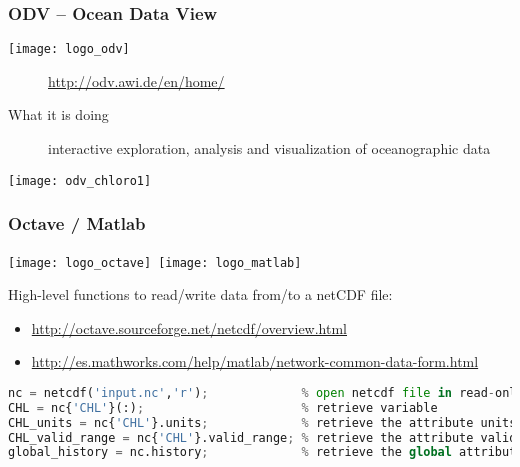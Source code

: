 \begin{frame}[c]
\frametitle{ODV -- Ocean Data View}

\texttt{[image: logo\_odv]}

\begin{description}
\item[\homepage] \url{http://odv.awi.de/en/home/}
\item[What it is doing] interactive exploration, analysis and visualization of oceanographic data
\end{description}

\texttt{[image: odv\_chloro1]}

\end{frame}

\begin{frame}[c, fragile]
\frametitle{Octave / Matlab}

\texttt{[image: logo\_octave]}~\texttt{[image: logo\_matlab]}


High-level functions to read/write data from/to a netCDF file:\\
{\scriptsize
\begin{itemize}
\item \url{http://octave.sourceforge.net/netcdf/overview.html}
\item \url{http://es.mathworks.com/help/matlab/network-common-data-form.html}
\end{itemize}

}
\vfill

\begin{lstlisting}[language=python,basicstyle=\tiny,title=Example with Octave]
nc = netcdf('input.nc','r');             % open netcdf file in read-only
CHL = nc{'CHL'}(:);                      % retrieve variable 
CHL_units = nc{'CHL'}.units;             % retrieve the attribute units
CHL_valid_range = nc{'CHL'}.valid_range; % retrieve the attribute valid_range 
global_history = nc.history;             % retrieve the global attribute history

\end{lstlisting}

\end{frame}

